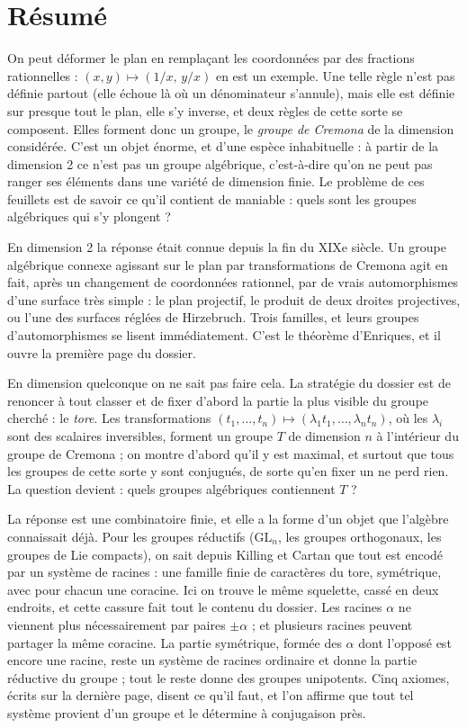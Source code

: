\documentclass[11pt,a4paper]{article}
\begin{document}
\section*{Résumé}

\begin{resume}
On peut déformer le plan en remplaçant les coordonnées par des fractions
rationnelles : $(x, y) \mapsto (1/x,\, y/x)$ en est un exemple. Une telle règle
n'est pas définie partout (elle échoue là où un dénominateur s'annule), mais
elle est définie sur presque tout le plan, elle s'y inverse, et deux règles de
cette sorte se composent. Elles forment donc un groupe, le \emph{groupe de
Cremona} de la dimension considérée. C'est un objet énorme, et d'une espèce
inhabituelle : à partir de la dimension 2 ce n'est pas un groupe algébrique,
c'est-à-dire qu'on ne peut pas ranger ses éléments dans une variété de
dimension finie. Le problème de ces feuillets est de savoir ce qu'il contient
de maniable : quels sont les groupes algébriques qui s'y plongent ?

En dimension 2 la réponse était connue depuis la fin du XIXe
siècle. Un groupe algébrique connexe agissant sur le plan par transformations
de Cremona agit en fait, après un changement de coordonnées rationnel, par de
vrais automorphismes d'une surface très simple : le plan projectif, le produit
de deux droites projectives, ou l'une des surfaces réglées de Hirzebruch. Trois
familles, et leurs groupes d'automorphismes se lisent immédiatement. C'est le
théorème d'Enriques, et il ouvre la première page du dossier.

En dimension quelconque on ne sait pas faire cela. La stratégie du dossier est
de renoncer à tout classer et de fixer d'abord la partie la plus visible du
groupe cherché : le \emph{tore}. Les transformations $(t_1, \ldots, t_n)
\mapsto (\lambda_1 t_1, \ldots, \lambda_n t_n)$, où les $\lambda_i$ sont des
scalaires inversibles, forment un groupe $T$ de dimension $n$ à l'intérieur du
groupe de Cremona ; on montre d'abord qu'il y est maximal, et surtout que tous
les groupes de cette sorte y sont conjugués, de sorte qu'en fixer un ne perd
rien. La question devient : quels groupes algébriques contiennent $T$ ?

La réponse est une combinatoire finie, et elle a la forme d'un objet que
l'algèbre connaissait déjà. Pour les groupes réductifs ($\mathrm{GL}_n$, les
groupes orthogonaux, les groupes de Lie compacts), on sait depuis Killing et
Cartan que tout est encodé par un système de racines : une famille finie de
caractères du tore, symétrique, avec pour chacun une coracine. Ici on trouve le
même squelette, cassé en deux endroits, et cette cassure fait tout le
contenu du dossier. Les racines $\alpha$ ne viennent plus nécessairement par paires
$\pm\alpha$ ; et plusieurs racines peuvent partager la même coracine. La partie
symétrique, formée des $\alpha$ dont l'opposé est encore une racine, reste un
système de racines ordinaire et donne la partie réductive du groupe ; tout le
reste donne des groupes unipotents. Cinq axiomes, écrits sur la dernière page,
disent ce qu'il faut, et l'on affirme que tout tel système provient
d'un groupe et le détermine à conjugaison près.


\end{resume}
\end{document}
